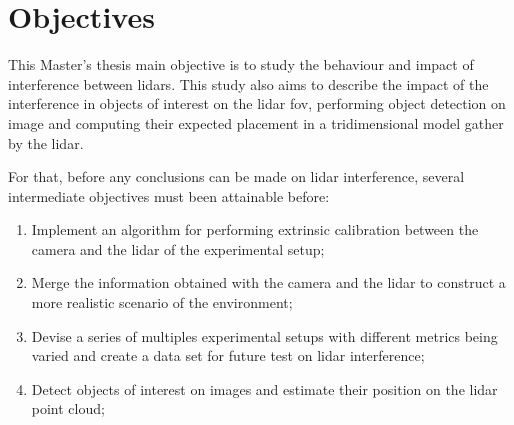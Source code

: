 






\section{Objectives}
\label{sec:introduction:objectives}
This Master's thesis main objective is to study the behaviour and impact of interference between \acp{lidar}. This study also aims to describe the impact of the interference in objects of interest on the \ac{lidar} \acl{fov}, performing object detection on image and computing their expected placement in a tridimensional model gather by the \ac{lidar}.

For that, before any conclusions can be made on \ac{lidar} interference, several intermediate objectives must been attainable before:
\begin{enumerate}
	\item Implement an algorithm for performing extrinsic calibration between the camera and the \ac{lidar} of the experimental setup;
	\item Merge the information obtained with the camera and the \ac{lidar} to construct a more realistic scenario of the environment;
	\item Devise a series of multiples experimental setups with different metrics being varied and create a data set for future test on \ac{lidar} interference;
	\item Detect objects of interest on images and estimate their position on the	\ac{lidar} point cloud;
\end{enumerate}



